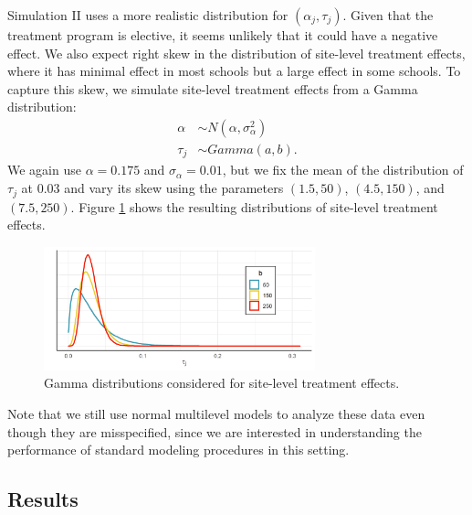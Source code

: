 \documentclass[]{article}
\begin{document}
Simulation II uses a more realistic distribution for $(\alpha_j, \tau_j)$.
Given that the treatment program is elective, it seems unlikely that it could have a negative effect.
We also expect right skew in the distribution of site-level treatment effects, where it has minimal effect in most schools but a large effect in some schools.
To capture this skew, we simulate site-level treatment effects from a Gamma distribution:
\begin{align*}
    \alpha &\sim N(\alpha, \sigma^2_\alpha) \\
    \tau_j &\sim Gamma(a, b).
\end{align*}
We again use $\alpha = 0.175$ and $\sigma_\alpha=0.01$, but we fix the mean of the distribution of $\tau_j$ at 0.03 and vary its skew using the parameters $(1.5, 50)$, $(4.5, 150)$, and $(7.5, 250)$.
Figure \ref{fig:gammas} shows the resulting distributions of site-level treatment effects.
\begin{figure}[t]
    \centering
    \includegraphics[width = 0.7\textwidth]{gamma.png}
    \caption{Gamma distributions considered for site-level treatment effects.}
    \label{fig:gammas}
\end{figure}
Note that we still use normal multilevel models to analyze these data even though they are misspecified, since we are interested in understanding the performance of standard modeling procedures in this setting.


\subsection{Results}
\end{document}
